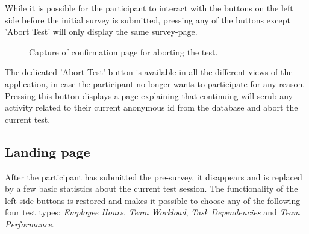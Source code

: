 \documentclass[nofilelist,dvipsnames]{cslthse-msc}
\begin{document}
{        While it is possible for the participant to interact with the buttons on
        the left side before the initial survey is submitted, pressing any of the
        buttons except 'Abort Test' will only display the same survey-page.

        \begin{figure}[h!]
          \centering
          \caption{Capture of confirmation page for aborting the test.}
          \label{label_abort}
        \end{figure}

        The dedicated 'Abort Test' button is available in all the different
        views of the application, in case the participant no longer wants to
        participate for any reason. Pressing this button displays a page
        explaining that continuing will scrub any activity related to their
        current anonymous id from the database and abort the current test.


      \subsection{Landing page}

        After the participant has submitted the pre-survey, it  disappears and is
        replaced by a few basic statistics about the current test session.
        The functionality of the left-side buttons is restored and makes it
        possible to choose any of the following four test types:
        \textit{Employee Hours},
        \textit{Team Workload},
        \textit{Task Dependencies} and
        \textit{Team Performance}.

}
\end{document}

